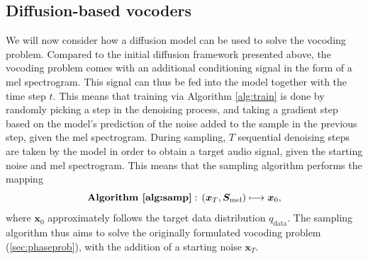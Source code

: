 \documentclass{report}
\begin{document}
\subsection{Diffusion-based vocoders}
\label{sec:diffvoc}

We will now consider how a diffusion model can be used to solve the vocoding problem. Compared to the initial diffusion framework presented above, the vocoding problem comes with an additional conditioning signal in the form of a mel spectrogram. This signal can thus be fed into the model together with the time step $t$. This means that training via Algorithm \ref{alg:train} is done by randomly picking a step in the denoising process, and taking a gradient step based on the model's prediction of the noise added to the sample in the previous step, given the mel spectrogram. During sampling, $T$ sequential denoising steps are taken by the model in order to obtain a target audio signal, given the starting noise and mel spectrogram. This means that the sampling algorithm performs the mapping
\begin{equation}
    \textbf{Algorithm \ref{alg:samp}}: \, (\bm{x}_T, \bm{S}_{\text{mel}}) \longmapsto \bm{x}_0,
\end{equation}
where $\bm{x}_0$ approximately follows the target data distribution $q_{\text{data}}$. The sampling algorithm thus aims to solve the originally formulated vocoding problem (\ref{sec:phaseprob}), with the addition of a starting noise $\bm{x}_T$.
\end{document}
